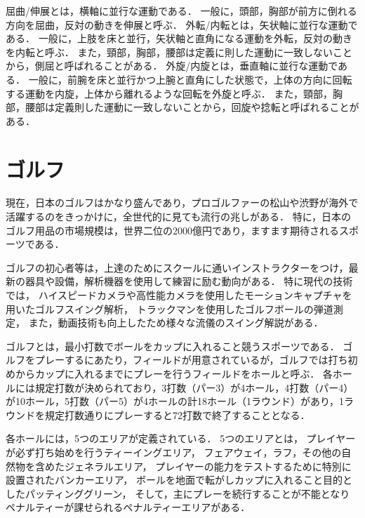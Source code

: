 
屈曲/伸展とは，横軸に並行な運動である．
一般に，頭部，胸部が前方に倒れる方向を屈曲，反対の動きを伸展と呼ぶ．
外転/内転とは，矢状軸に並行な運動である．
一般に，上肢を床と並行，矢状軸と直角になる運動を外転，反対の動きを内転と呼ぶ．
また，頸部，胸部，腰部は定義に則した運動に一致しないことから，側屈と呼ばれることがある．
外旋/内旋とは，垂直軸に並行な運動である．
一般に，前腕を床と並行かつ上腕と直角にした状態で，上体の方向に回転する運動を内旋，上体から離れるような回転を外旋と呼ぶ．
また，頸部，胸部，腰部は定義則した運動に一致しないことから，回旋や捻転と呼ばれることがある．

\section{ゴルフ}
%
現在，日本のゴルフはかなり盛んであり，プロゴルファーの松山や渋野が海外で活躍するのをきっかけに，全世代的に見ても流行の兆しがある．
特に，日本のゴルフ用品の市場規模は，世界二位の2000億円であり，ますます期待されるスポーツである．

ゴルフの初心者等は，上達のためにスクールに通いインストラクターをつけ，最新の器具や設備，解析機器を使用して練習に励む動向がある．
特に現代の技術では，
ハイスピードカメラや高性能カメラを使用したモーションキャプチャを用いたゴルフスイング解析，
トラックマンを使用したゴルフボールの弾道測定，
また，動画技術も向上したため様々な流儀のスイング解説がある．

ゴルフとは，最小打数でボールをカップに入れること競うスポーツである．
ゴルフをプレーするにあたり，フィールドが用意されているが，ゴルフでは打ち初めからカップに入れるまでにプレーを行うフィールドをホールと呼ぶ．
各ホールには規定打数が決められており，3打数（パー3）が4ホール，4打数（パー4）が10ホール，5打数（パー5）が4ホールの計18ホール（1ラウンド）があり，1ラウンドを規定打数通りにプレーすると72打数で終了することとなる．

各ホールには，5つのエリアが定義されている．
5つのエリアとは，
プレイヤーが必ず打ち始めを行うティーイングエリア，
フェアウェイ，ラフ，その他の自然物を含めたジェネラルエリア，
プレイヤーの能力をテストするために特別に設置されたバンカーエリア，
ボールを地面で転がしカップに入れること目的としたパッティンググリーン，
そして，主にプレーを続行することが不能となりペナルティーが課せられるペナルティーエリアがある．

